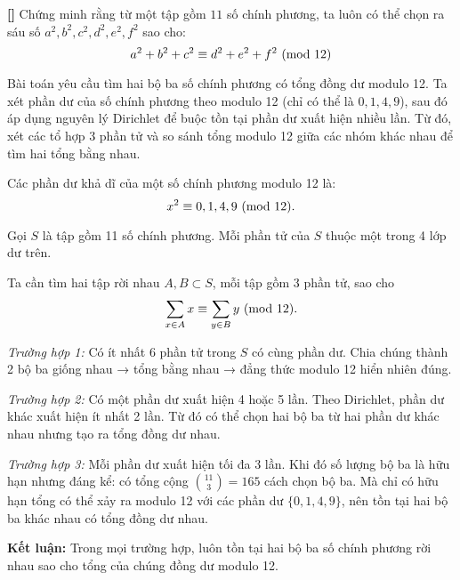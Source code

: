 \documentclass[../01-divisibility.tex]{subfiles}
\begin{document}
\begin{example*}\label{example:IND-2015-N6}\textbf{[]}
	Chứng minh rằng từ một tập gồm \( 11 \) số chính phương, ta luôn có thể chọn ra sáu số \( a^2, b^2, c^2, d^2, e^2, f^2 \) sao cho:
	\[
		a^2 + b^2 + c^2 \equiv d^2 + e^2 + f^2 \ (\mathrm{mod}\ 12)
	\]
\end{example*}

\begin{story*}
	Bài toán yêu cầu tìm hai bộ ba số chính phương có tổng đồng dư modulo 12.  
	Ta xét phần dư của số chính phương theo modulo 12 (chỉ có thể là \( 0, 1, 4, 9 \)), sau đó áp dụng nguyên lý Dirichlet để buộc tồn tại phần dư xuất hiện nhiều lần.  
	Từ đó, xét các tổ hợp 3 phần tử và so sánh tổng modulo 12 giữa các nhóm khác nhau để tìm hai tổng bằng nhau.
\end{story*}

\begin{soln}
	Các phần dư khả dĩ của một số chính phương modulo 12 là:
	\[
		x^2 \equiv 0, 1, 4, 9 \ (\mathrm{mod}\ 12).
	\]

	Gọi \( S \) là tập gồm 11 số chính phương. Mỗi phần tử của \( S \) thuộc một trong 4 lớp dư trên.

	Ta cần tìm hai tập rời nhau \( A, B \subset S \), mỗi tập gồm 3 phần tử, sao cho
	\[
		\sum_{x \in A} x \equiv \sum_{y \in B} y \ (\mathrm{mod}\ 12).
	\]

	\textit{Trường hợp 1:} Có ít nhất 6 phần tử trong \( S \) có cùng phần dư.  
	Chia chúng thành 2 bộ ba giống nhau → tổng bằng nhau → đẳng thức modulo 12 hiển nhiên đúng.

	\textit{Trường hợp 2:} Có một phần dư xuất hiện 4 hoặc 5 lần.  
	Theo Dirichlet, phần dư khác xuất hiện ít nhất 2 lần. Từ đó có thể chọn hai bộ ba từ hai phần dư khác nhau nhưng tạo ra tổng đồng dư nhau.

	\textit{Trường hợp 3:} Mỗi phần dư xuất hiện tối đa 3 lần.  
	Khi đó số lượng bộ ba là hữu hạn nhưng đáng kể: có tổng cộng \( \binom{11}{3} = 165 \) cách chọn bộ ba.  
	Mà chỉ có hữu hạn tổng có thể xảy ra modulo 12 với các phần dư \( \{0,1,4,9\} \), nên tồn tại hai bộ ba khác nhau có tổng đồng dư nhau.

	\textbf{Kết luận:} Trong mọi trường hợp, luôn tồn tại hai bộ ba số chính phương rời nhau sao cho tổng của chúng đồng dư modulo 12.
\end{soln}

\end{document}
